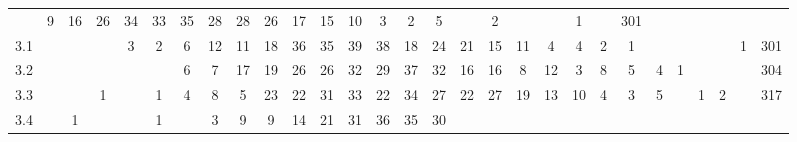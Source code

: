\documentclass[12pt,english]{report}
\begin{document}
\begin{table}
{\begin{tabular}{@{\extracolsep{5pt}}|c|ccccccccccccccccccccccccccc|c|}
& 9                        & 16                       & 26
& 34                       & 33                       & 35
& 28                       & 28                       & 26
& 17                       & 15                       & 10
& 3                        & 2                        & 5
&                         & 2                       &                         &
& 1                       &    & 301         \\ \cline{1-1} \cline{29-29}
3.1         &                        &                         &
& 3                       & 2                       & 6
& 12                       & 11                       & 18
& 36                       & 35                       & 39
& 38                       & 18                       & 24
& 21                       & 15                       & 11
& 4                        & 4                        & 2
& 1                       &                         &                         &
&                         & 1  & 301         \\ \cline{1-1} \cline{29-29}
3.2         &                        &                         &
&                         &                         & 6
& 7                        & 17                       & 19
& 26                       & 26                       & 32
& 29                       & 37                       & 32
& 16                       & 16                       & 8
& 12                       & 3                        & 8
& 5                       & 4                       & 1                       &
&                         &    & 304         \\ \cline{1-1} \cline{29-29}
3.3         &                        &                         & 1
&                         & 1                       & 4
& 8                        & 5                        & 23
& 22                       & 31                       & 33
& 22                       & 34                       & 27
& 22                       & 27                       & 19
& 13                       & 10                       & 4
& 3                       & 5                       &                         &
1                       & 2                       &    & 317         \\
\cline{1-1} \cline{29-29}
3.4         &                        & 1                       &
&                         & 1                       &
& 3                        & 9                        & 9
& 14                       & 21                       & 31
& 36                       & 35                       & 30

\end{tabular}}
\end{table}
\end{document}
